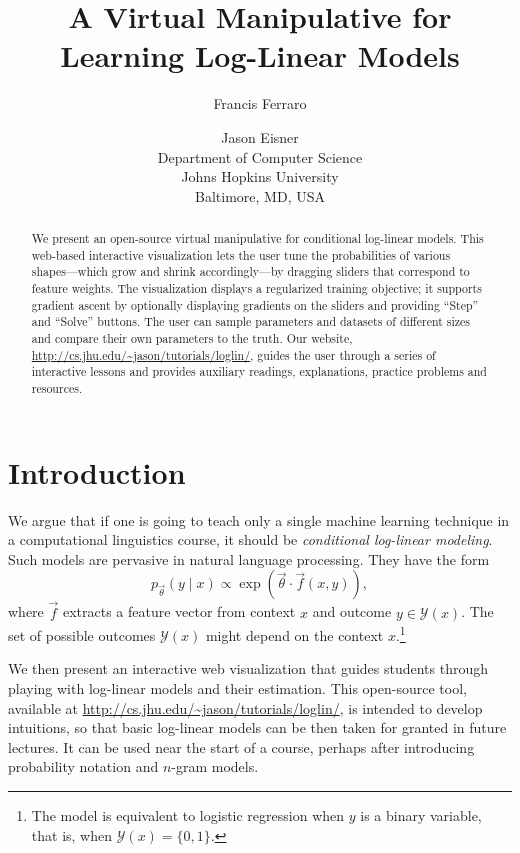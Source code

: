 \documentclass[11pt,letterpaper]{article}
\title{A Virtual Manipulative for Learning Log-Linear Models}
\author{
Francis Ferraro \and Jason Eisner\\
Department of Computer Science\\
Johns Hopkins University\\
Baltimore, MD, USA
}
\date{}
\newcommand{\WhereToFind}[0]{\url{http://cs.jhu.edu/~jason/tutorials/loglin/}}
\begin{document}
\maketitle

\begin{abstract}
  We present an open-source virtual manipulative for conditional
  log-linear models. This web-based interactive visualization lets
  the user tune the probabilities of various shapes---which grow and
  shrink accordingly---by dragging sliders that correspond to feature
  weights.  The visualization displays a regularized training
  objective; it supports gradient ascent by optionally displaying
  gradients on the sliders and providing ``Step'' and ``Solve''
  buttons.  The user can sample parameters and datasets of
  different sizes and compare their own parameters to the truth.  Our
  website, \WhereToFind{}, guides the user through a series of
  interactive lessons and provides auxiliary readings, explanations, 
practice problems and resources.
\end{abstract}

\section{Introduction}\label{sec:intro}
We argue that if one is going to teach only a single machine learning
technique in a computational linguistics course, it should be {\em
  conditional log-linear modeling}.  Such models are pervasive in
natural language processing.  They have the form
\begin{equation}\label{eqn:loglin}
p_{\vec{\theta}}(y \mid x) \propto \exp{\left(\vec{\theta} \cdot \vec{f}\left(x,y\right)\right)},
\end{equation}
where $\vec{f}$ extracts a feature vector from context $x$ and
outcome $y \in \mathcal{Y}(x)$.  The set of possible
outcomes $\mathcal{Y}(x)$ might depend on the context
$x$.\footnote{\label{fn:logistic}The model is equivalent to logistic regression
  when $y$ is a binary variable, that is, when $\mathcal{Y}(x)=\{0,1\}$.}

We then present an interactive web visualization that guides students
through playing with log-linear models and their estimation. This open-source 
tool, available at \WhereToFind{}, is intended to develop intuitions, so that basic
log-linear models can be then taken for granted in future lectures.  It can be used near
the start of a course, perhaps after introducing probability notation
and $n$-gram models.
\end{document}
